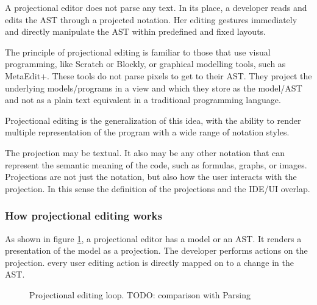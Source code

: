 A projectional editor does not parse any text.
In its place, a developer reads and edits the AST through a projected notation.
Her editing gestures immediately and directly manipulate the AST within predefined and fixed layouts.

The principle of projectional editing is familiar to those that use visual programming, like Scratch or Blockly, or graphical modelling tools, such as MetaEdit+.
These tools do not parse pixels to get to their AST. 
They project the underlying models/programs in a view and which they store as the model/AST and not as a plain text equivalent in a traditional programming language.

Projectional editing is the generalization of this idea, with the ability to render multiple representation of the program with a wide range of notation styles.

The projection may be textual. 
It also may be any other notation that can represent the semantic meaning of the code, such as formulas, graphs, or images.
Projections are not just the notation, but also how the user interacts with the projection.
In this sense the definition of the projections and the IDE/UI overlap.



\subsubsection{How projectional editing works}

As shown in figure \ref{fig:projectionalEditing_loop}, a projectional editor has a model or an AST. 
It renders a presentation of the model as a projection. 
The developer performs actions on the projection.
every user editing action is directly mapped on to a change in the AST. 

\begin{figure}[h]
    \centering
    \caption{Projectional editing loop. TODO: comparison with Parsing}
    \label{fig:projectionalEditing_loop}
\end{figure}

